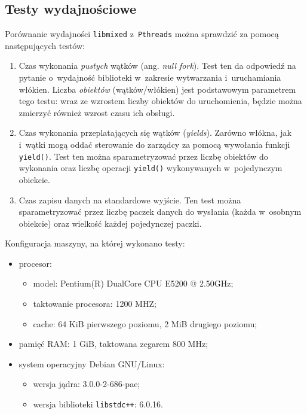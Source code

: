 \documentclass[12pt]{mwart}
\newcommand{\code}{\texttt}
\newcommand{\procbr}{()}
\newcommand{\function}[1]{\code{#1\procbr}}
\begin{document}
\subsection{Testy wydajnościowe}
\indent
	Porównanie wydajności \code{libmixed} z~\code{Pthreads} można sprawdzić za pomocą następujących testów:
	\begin{enumerate}
		\item Czas wykonania \emph{pustych} wątków (ang. \emph{null fork}). Test ten da odpowiedź na pytanie o~wydajność biblioteki w~zakresie
      wytwarzania i~uruchamiania włókien. Liczba \emph{obiektów} (wątków/włókien) jest podstawowym parametrem tego testu: wraz ze wzrostem liczby obiektów do
      uruchomienia, będzie można zmierzyć również wzrost czasu ich obsługi.
    \item Czas wykonania przeplatających się wątków (\emph{yields}). Zarówno włókna, jak i~wątki mogą oddać sterowanie do zarządcy za pomocą wywołania funkcji 
      \function{yield}. Test ten można sparametryzować przez liczbę obiektów do wykonania oraz liczbę operacji \function{yield} wykonywanych
      w~pojedynczym obiekcie.
		\item Czas zapisu danych na standardowe wyjście. Ten test można sparametryzować przez liczbę paczek danych do wysłania (każda w~osobnym obiekcie)
      oraz wielkość każdej pojedynczej paczki.
	\end{enumerate}
\par
\indent
  Konfiguracja maszyny, na której wykonano testy:
  \begin{itemize}
    \item procesor: 
      \begin{itemize}
        \item model: Pentium(R) Dual\dywiz Core  CPU      E5200  @ 2.50GHz;
        \item taktowanie procesora: 1200 MHZ;
        \item cache: 64 KiB pierwszego poziomu, 2 MiB drugiego poziomu;
      \end{itemize}
    \item pamięć RAM: 1 GiB, taktowana zegarem 800 MHz;
    \item system operacyjny Debian GNU/Linux:
      \begin{itemize}
        \item wersja jądra: 3.0.0-2-686-pae;
        \item wersja biblioteki \code{libstdc++}: 6.0.16.
      \end{itemize}
  \end{itemize}
\end{document}
